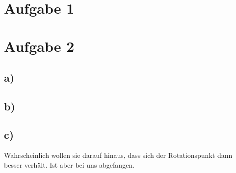 \documentclass{../Vorlage/mat}
\begin{document}
 \\

\section*{Aufgabe 1}


\section*{Aufgabe 2}
\subsection*{a)}
\subsection*{b)}
\subsection*{c)}
Wahrscheinlich wollen sie darauf hinaus, dass sich der Rotationspunkt dann besser verhält. Ist aber bei uns abgefangen.
\end{document}
